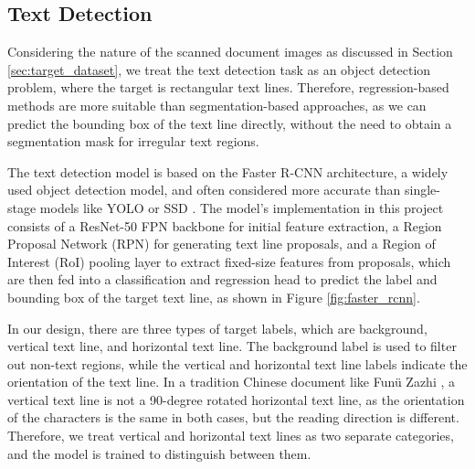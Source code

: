 \documentclass[12pt,twoside]{report}
\begin{document}
\subsection{Text Detection}
\label{sec:text_detection}
Considering the nature of the scanned document images as discussed in Section \ref{sec:target_dataset}, we treat the text detection task as an object detection problem, where the target is rectangular text lines. Therefore, regression-based methods are more suitable than segmentation-based approaches, as we can predict the bounding box of the text line directly, without the need to obtain a segmentation mask for irregular text regions.

The text detection model is based on the Faster R-CNN \cite{ren2015faster} architecture, a widely used object detection model, and often considered more accurate than single-stage models like YOLO \cite{redmon2016yolo9000} or SSD \cite{liu2016ssd}. The model's implementation in this project consists of a ResNet-50 FPN backbone \cite{he2015resnet,li2021benchmark} for initial feature extraction, a Region Proposal Network (RPN) \cite{ren2015faster} for generating text line proposals, and a Region of Interest (RoI) pooling layer \cite{ren2015faster} to extract fixed-size features from proposals, which are then fed into a classification and regression head to predict the label and bounding box of the target text line, as shown in Figure \ref{fig:faster_rcnn}.

In our design, there are three types of target labels, which are background, vertical text line, and horizontal text line. The background label is used to filter out non-text regions, while the vertical and horizontal text line labels indicate the orientation of the text line. In a tradition Chinese document like Funü Zazhi \cite{fnzz}, a vertical text line is not a 90-degree rotated horizontal text line, as the orientation of the characters is the same in both cases, but the reading direction is different. Therefore, we treat vertical and horizontal text lines as two separate categories, and the model is trained to distinguish between them.
\end{document}
